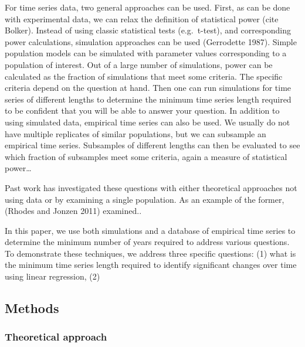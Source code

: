 \documentclass[11pt,]{article}
\begin{document}
For time series data, two general approaches can be used. First, as can
be done with experimental data, we can relax the definition of
statistical power (cite Bolker). Instead of using classic statistical
tests (e.g.~t-test), and corresponding power calculations, simulation
approaches can be used (Gerrodette 1987). Simple population models can
be simulated with parameter values corresponding to a population of
interest. Out of a large number of simulations, power can be calculated
as the fraction of simulations that meet some criteria. The specific
criteria depend on the question at hand. Then one can run simulations
for time series of different lengths to determine the minimum time
series length required to be confident that you will be able to answer
your question. In addition to using simulated data, empirical time
series can also be used. We usually do not have multiple replicates of
similar populations, but we can subsample an empirical time series.
Subsamples of different lengths can then be evaluated to see which
fraction of subsamples meet some criteria, again a measure of
statistical power\ldots{}

Past work has investigated these questions with either theoretical
approaches not using data or by examining a single population. As an
example of the former, (Rhodes and Jonzen 2011) examined..

In this paper, we use both simulations and a database of empirical time
series to determine the minimum number of years required to address
various questions. To demonstrate these techniques, we address three
specific questions: (1) what is the minimum time series length required
to identify significant changes over time using linear regression, (2)

\subsection{Methods}\label{methods}

\subsubsection{Theoretical approach}\label{theoretical-approach}
\end{document}
